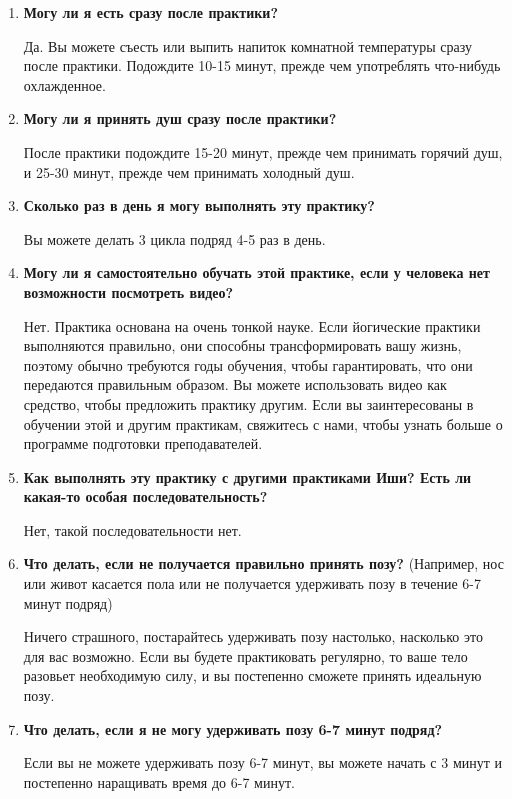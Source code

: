\documentclass[
a4paper, %
12pt, %
article,
onecolumn, %
openany, %
]{memoir}
\begin{document}
\begin{enumerate}
\item \textbf{Могу ли я есть сразу после практики?}

Да. Вы можете съесть или выпить напиток комнатной температуры сразу после
практики. Подождите 10-15 минут, прежде чем употреблять что-нибудь охлажденное.
\item \textbf{Могу ли я принять душ сразу после практики?}

После практики подождите 15-20 минут, прежде чем принимать горячий душ, и 25-30
минут, прежде чем принимать холодный душ.

\item \textbf{Сколько раз в день я могу выполнять эту практику?}

Вы можете делать 3 цикла подряд 4-5 раз в день.
\item \textbf{Могу ли я самостоятельно обучать этой практике, если у человека нет возможности посмотреть видео?}

Нет. Практика основана на очень тонкой науке. Если йогические практики выполняются
правильно, они способны трансформировать вашу жизнь, поэтому обычно требуются
годы обучения, чтобы гарантировать, что они передаются правильным образом. Вы
можете использовать видео как средство, чтобы предложить практику другим. Если вы
заинтересованы в обучении этой и другим практикам, свяжитесь с нами, чтобы узнать
больше о программе подготовки преподавателей.
\item \textbf{Как выполнять эту практику с другими практиками Иши? Есть ли какая-то особая последовательность?}

Нет, такой последовательности нет.
\item \textbf{Что делать, если не получается правильно принять позу?}
(Например, нос или живот касается пола или не получается удерживать позу в течение
6-7 минут подряд)

Ничего страшного, постарайтесь удерживать позу настолько, насколько это для вас
возможно. Если вы будете практиковать регулярно, то ваше тело разовьет
необходимую силу, и вы постепенно сможете принять идеальную позу.

\item \textbf{Что делать, если я не могу удерживать позу 6-7 минут подряд?}

Если вы не можете удерживать позу 6-7 минут, вы можете начать с 3 минут и
постепенно наращивать время до 6-7 минут.






\end{enumerate}
\end{document}
